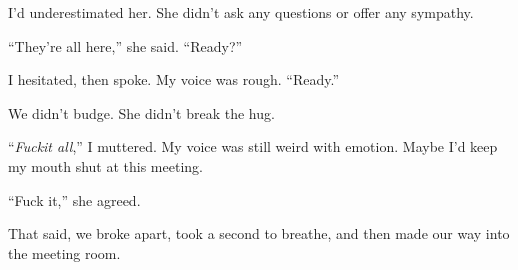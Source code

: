 I'd underestimated her.  She didn't ask any questions or offer any sympathy.



``They're all here,'' she said.  ``Ready?''



I hesitated, then spoke.  My voice was rough.  ``Ready.''



We didn't budge.  She didn't break the hug.



``\emph{Fuck}\emph{it all},'' I muttered.  My voice was still weird with emotion.  Maybe I'd keep my mouth shut at this meeting.



``Fuck it,'' she agreed.



That said, we broke apart, took a second to breathe, and then made our way into the meeting room.





